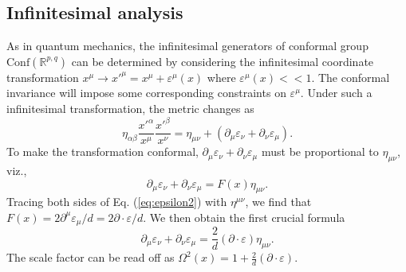 \documentclass[graybox,envcountchap,sectrefs]{svmono}
\begin{document}
\subsection{Infinitesimal analysis}
As in quantum mechanics, the infinitesimal generators of conformal group $\mathrm{Conf}(\mathbb{R}^{p,q})$ can be determined by considering the infinitesimal coordinate transformation $x^{\mu}\to x'^{\mu}=x^{\mu}+\varepsilon^{\mu}(x)$ where $\varepsilon^{\mu}(x)<<1$. The conformal invariance will impose some corresponding constraints on $\varepsilon^{\mu}$. Under such a infinitesimal transformation, the metric changes as
\begin{equation}\label{eq:epsilon1}
\eta_{\alpha\beta}\frac{x'^{\alpha}}{x^{\mu}}\frac{x'^{\beta}}{x^{\nu}}=\eta_{\mu\nu}+(\partial_{\mu}\varepsilon_{\nu}+\partial_{\nu}\varepsilon_{\mu}).
\end{equation}
To make the transformation conformal, $\partial_{\mu}\varepsilon_{\nu}+\partial_{\nu}\varepsilon_{\mu}$ must be proportional to $\eta_{\mu\nu}$, viz.,
\begin{equation}\label{eq:epsilon2}
\partial_{\mu}\varepsilon_{\nu}+\partial_{\nu}\varepsilon_{\mu}=F(x)\eta_{\mu\nu}.
\end{equation}
Tracing both sides of Eq. (\ref{eq:epsilon2}) with $\eta^{\mu\nu}$, we find that $F(x)=2\partial^{\mu}\varepsilon_{\mu}/d=2\partial \cdot \varepsilon /d$. We then obtain the first crucial formula
\begin{equation}\label{eq:epsilon3}
\boxed{\partial_{\mu}\varepsilon_{\nu}+\partial_{\nu}\varepsilon_{\mu}=\frac{2}{d}(\partial\cdot \varepsilon) \eta_{\mu\nu}.}
\end{equation}
The scale factor can be read off as $\Omega^2(x)=1+\frac{2}{d}(\partial\cdot \varepsilon)$.
\end{document}
